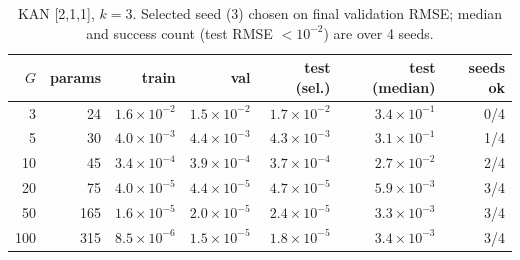 \begin{table}[t]
\caption{KAN [2,1,1], $k{=}3$. Selected seed (3) chosen on final validation RMSE; median and success count (test RMSE $<10^{-2}$) are over 4 seeds.}\label{tab:grid}
\centering\footnotesize
\begin{tabular}{rrrrrrr}
\toprule
$G$ & params & train & val & test (sel.) & test (median) & seeds ok \\
\midrule
3 & 24 & $1.6\!\times\!10^{-2}$ & $1.5\!\times\!10^{-2}$ & $1.7\!\times\!10^{-2}$ & $3.4\!\times\!10^{-1}$ & 0/4 \\
5 & 30 & $4.0\!\times\!10^{-3}$ & $4.4\!\times\!10^{-3}$ & $4.3\!\times\!10^{-3}$ & $3.1\!\times\!10^{-1}$ & 1/4 \\
10 & 45 & $3.4\!\times\!10^{-4}$ & $3.9\!\times\!10^{-4}$ & $3.7\!\times\!10^{-4}$ & $2.7\!\times\!10^{-2}$ & 2/4 \\
20 & 75 & $4.0\!\times\!10^{-5}$ & $4.4\!\times\!10^{-5}$ & $4.7\!\times\!10^{-5}$ & $5.9\!\times\!10^{-3}$ & 3/4 \\
50 & 165 & $1.6\!\times\!10^{-5}$ & $2.0\!\times\!10^{-5}$ & $2.4\!\times\!10^{-5}$ & $3.3\!\times\!10^{-3}$ & 3/4 \\
100 & 315 & $8.5\!\times\!10^{-6}$ & $1.5\!\times\!10^{-5}$ & $1.8\!\times\!10^{-5}$ & $3.4\!\times\!10^{-3}$ & 3/4 \\
\bottomrule
\end{tabular}
\end{table}

